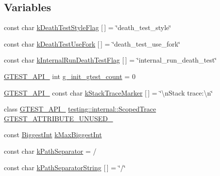 \subsection*{Variables}
\begin{DoxyCompactItemize}
\item 
const char \hyperlink{namespacetesting_1_1internal_a008ebfe0c0347d65e5e06e4d310981b3}{k\+Death\+Test\+Style\+Flag} \mbox{[}$\,$\mbox{]} = \char`\"{}death\+\_\+test\+\_\+style\char`\"{}
\item 
const char \hyperlink{namespacetesting_1_1internal_a32051e2574562b548be3e26a52eaa553}{k\+Death\+Test\+Use\+Fork} \mbox{[}$\,$\mbox{]} = \char`\"{}death\+\_\+test\+\_\+use\+\_\+fork\char`\"{}
\item 
const char \hyperlink{namespacetesting_1_1internal_a8572303d929880adf30db00952e1c45d}{k\+Internal\+Run\+Death\+Test\+Flag} \mbox{[}$\,$\mbox{]} = \char`\"{}internal\+\_\+run\+\_\+death\+\_\+test\char`\"{}
\item 
\hyperlink{gtest-port_8h_aa73be6f0ba4a7456180a94904ce17790}{G\+T\+E\+S\+T\+\_\+\+A\+P\+I\+\_\+} int \hyperlink{namespacetesting_1_1internal_ac2e10dd08851d714ed2cc52e0b0d72b9}{g\+\_\+init\+\_\+gtest\+\_\+count} = 0
\item 
\hyperlink{gtest-port_8h_aa73be6f0ba4a7456180a94904ce17790}{G\+T\+E\+S\+T\+\_\+\+A\+P\+I\+\_\+} const char \hyperlink{namespacetesting_1_1internal_abb38528ca6a45df265b19f5ccb3d16d9}{k\+Stack\+Trace\+Marker} \mbox{[}$\,$\mbox{]} = \char`\"{}\textbackslash{}n\+Stack trace\+:\textbackslash{}n\char`\"{}
\item 
class \hyperlink{gtest-port_8h_aa73be6f0ba4a7456180a94904ce17790}{G\+T\+E\+S\+T\+\_\+\+A\+P\+I\+\_\+} \hyperlink{classtesting_1_1internal_1_1_scoped_trace}{testing\+::internal\+::\+Scoped\+Trace} \hyperlink{namespacetesting_1_1internal_a581ac897511489c75a06aa328dcfb62f}{G\+T\+E\+S\+T\+\_\+\+A\+T\+T\+R\+I\+B\+U\+T\+E\+\_\+\+U\+N\+U\+S\+E\+D\+\_\+}
\item 
const \hyperlink{namespacetesting_1_1internal_a05c6bd9ede5ccdf25191a590d610dcc6}{Biggest\+Int} \hyperlink{namespacetesting_1_1internal_ad901880198832bc166d2493096b451f7}{k\+Max\+Biggest\+Int}
\item 
const char \hyperlink{namespacetesting_1_1internal_afcd71adaa9d1e6df7b282a17fc48125c}{k\+Path\+Separator} = \textquotesingle{}/\textquotesingle{}
\item 
const char \hyperlink{namespacetesting_1_1internal_ab8904ed136370f97cef4fd6d9eeb8439}{k\+Path\+Separator\+String} \mbox{[}$\,$\mbox{]} = \char`\"{}/\char`\"{}

\end{DoxyCompactItemize}
